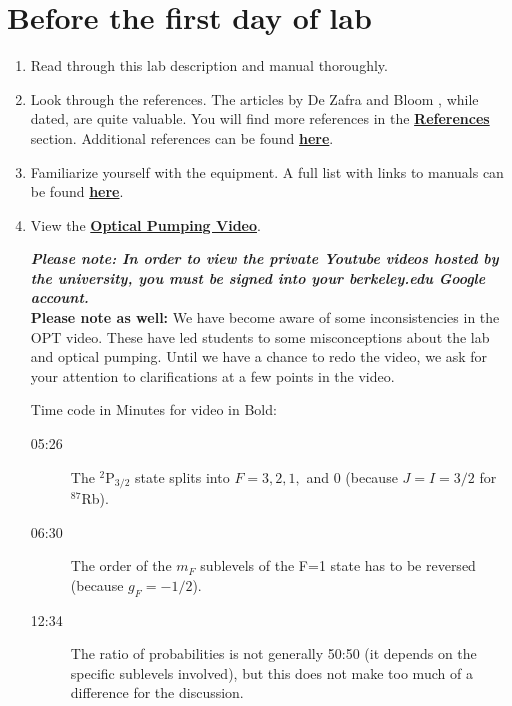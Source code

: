 \documentclass{../lab}
\newcommand{\OpticalPumpingVideo}{https://www.youtube.com/watch?v=v4StxGAhm8Y}
\newcommand{\AdditionalReferences}
{https://berkeley-physics111b.github.io/assets/pdf/oldwebsitestructure/OPT/References/00-OPT_Additional\%20References\%20and\%20Resources_Index.pdf}
\newcommand{\EquipmentList}
{https://berkeley-physics111b.github.io/assets/pdf/oldwebsitestructure/OPT/Equipment/00-OPT_Equipment\%20List_Index.pdf}
\begin{document}
\section{Before the first day of lab}

\begin{enumerate}
    \item Read through this lab description and manual thoroughly.
    
    \item Look through the references. The articles by De Zafra \cite{Zafra} and Bloom \cite{Bloom}, while dated, are quite valuable. You will find more references in the \hyperref[references]{\textbf{References}} section. Additional references can be found \href{\AdditionalReferences}{\textbf{here}}.

    \item Familiarize yourself with the equipment. A full list with links to manuals can be found \href{\EquipmentList}{\textbf{here}}.

    
    \item   View the \href{\OpticalPumpingVideo}{\textbf{Optical Pumping Video}}.
    
    \emph{\textbf{Please note: In order to view the private Youtube videos hosted by the university, you must be signed into your berkeley.edu Google account.}}\\
  
    \textbf{Please note as well:} We have become aware of some inconsistencies in the OPT video.  These have led students to some misconceptions about the lab and optical pumping.  Until we have a chance to redo the video, we ask for your attention to clarifications at a few points in the video.
    
    Time code in Minutes for video in Bold:

    \begin{description}
        \item [05:26] The $^2$P$_{3/2}$ state splits into $F = 3,2,1,$ and 0 (because $J = I = 3/2$ for $^{87}$Rb).

        \item [06:30] The order of the $m_F$ sublevels of the F=1 state has to be reversed (because $g_F = -1/2$).

        \item [12:34] The ratio of probabilities is not generally 50:50 (it depends on the specific sublevels involved), but this does not make too much of a difference for the discussion.


\end{description}
\end{enumerate}
\end{document}
